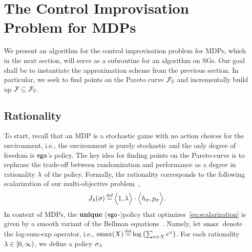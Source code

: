 \section{The Control Improvisation Problem for MDPs}
\label{sec:mdps}

We present an algorithm for the control improvisation problem for
MDPs, which in the next section, will serve as a subroutine for an
algorithm on SGs. Our goal shall be to instantiate the approximation
scheme from the previous section. In particular, we seek
to find points on the Pareto curve $\mathcal{F}_{\mathbb{S}}$ and
incrementally build up $\mathcal{F}_{} \subseteq \mathcal{F}_{\mathbb{S}}$.
\subsection{Rationality}
To start, recall that an MDP is a stochastic game with no action
choices for the environment, i.e., the environment is purely
stochastic and the only degree of freedom is $\mathsf{ego}$'s policy.  The
key idea for finding points on the Pareto-curve is to rephrase the
trade-off between randomization and performance as a degree in
rationality $\lambda$ of the policy.  Formally, the rationality
corresponds to the following scalarization of our multi-objective
problem~\cite{DBLP:journals/corr/abs-1805-00909},
\begin{equation}
  \label{eq:scalarization}
  J_\rat(\sched) \eqdef \Big\langle 1, \rat\Big\rangle \cdot \Big\langle\rndp_\sched, \scp_\sched\Big\rangle.
\end{equation}
In context of MDPs, the \textbf{unique} ($\mathsf{ego}$-)policy that
optimizes~\eqref{eq:scalarization} is given by a smooth variant of the
Bellman equations~\cite{mceThesis, DBLP:conf/cav/Vazquez-Chanlatte20}. Namely, let $\operatorname*{\mathrm{smax}}{}$ denote
the log-sum-exp operator, i.e.,
$\smoothmax(X) \eqdef \log \left( \sum_{x\in X} e^x \right)$. For each
rationality $\lambda \in [0, \infty)$, we define a policy $\sigma_\lambda$
